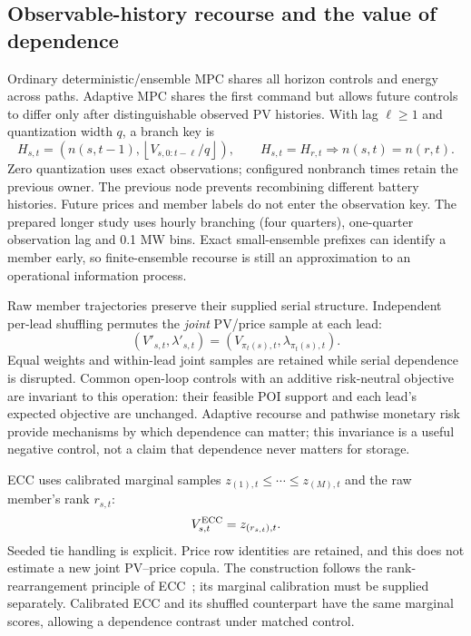 \subsection{Observable-history recourse and the value of dependence}
Ordinary deterministic/ensemble MPC shares all horizon controls and energy
across paths. Adaptive MPC shares the first command but allows future controls
to differ only after distinguishable observed PV histories. With lag $\ell\ge1$
and quantization width $q$, a branch key is
\begin{equation}
 H_{s,t}=\left(n(s,t-1),
       \left\lfloor V_{s,0:t-\ell}/q\right\rfloor\right),
 \qquad H_{s,t}=H_{r,t}\Rightarrow n(s,t)=n(r,t).
\end{equation}
Zero quantization uses exact observations; configured nonbranch times retain
the previous owner. The previous node prevents recombining different battery
histories. Future prices and member labels do not enter the observation key.
The prepared longer study uses hourly branching (four quarters), one-quarter
observation lag and 0.1 MW bins. Exact small-ensemble prefixes can identify a
member early, so finite-ensemble recourse is still an approximation to an
operational information process.

Raw member trajectories preserve their supplied serial structure. Independent
per-lead shuffling permutes the \emph{joint} PV/price sample at each lead:
\begin{equation}
 (V'_{s,t},\lambda'_{s,t})=(V_{\pi_t(s),t},\lambda_{\pi_t(s),t}).
\end{equation}
Equal weights and within-lead joint samples are retained while serial dependence
is disrupted. Common open-loop controls with an additive risk-neutral objective
are invariant to this operation: their feasible POI support and each lead's
expected objective are unchanged. Adaptive recourse and pathwise monetary risk
provide mechanisms by which dependence can matter; this invariance is a useful
negative control, not a claim that dependence never matters for storage.

ECC uses calibrated marginal samples $z_{(1),t}\le\cdots\le z_{(M),t}$ and the
raw member's rank $r_{s,t}$:
\begin{equation}
 V^{\rm ECC}_{s,t}=z_{(r_{s,t}),t}.
\end{equation}
Seeded tie handling is explicit. Price row identities are retained, and this
does not estimate a new joint PV--price copula. The construction follows the
rank-rearrangement principle of ECC~\cite{ecc}; its marginal calibration must
be supplied separately. Calibrated ECC and its shuffled counterpart have the
same marginal scores, allowing a dependence contrast under matched control.

